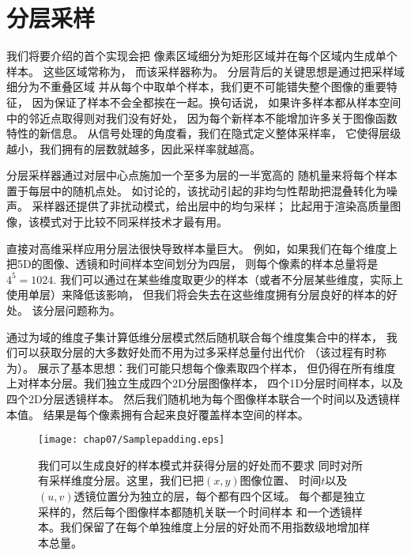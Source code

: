\section{分层采样}\label{sec:分层采样}
我们将要介绍的首个实现会把
像素区域细分为矩形区域并在每个区域内生成单个样本。
这些区域常称为，
而该采样器称为。
分层背后的关键思想是通过把采样域细分为不重叠区域
并从每个中取单个样本，我们更不可能错失整个图像的重要特征，
因为保证了样本不会全都挨在一起。换句话说，
如果许多样本都从样本空间中的邻近点取得则对我们没有好处，
因为每个新样本不能增加许多关于图像函数特性的新信息。
从信号处理的角度看，我们在隐式定义整体采样率，
它使得层级越小，我们拥有的层数就越多，因此采样率就越高。

分层采样器通过对层中心点施加一个至多为层的一半宽高的
随机量来将每个样本置于每层中的随机点处。
如讨论的，该扰动引起的非均匀性帮助把混叠转化为噪声。
采样器还提供了非扰动模式，给出层中的均匀采样；
比起用于渲染高质量图像，该模式对于比较不同采样技术才最有用。

直接对高维采样应用分层法很快导致样本量巨大。
例如，如果我们在每个维度上把5D的图像、透镜和时间样本空间划分为四层，
则每个像素的样本总量将是$4^5=1024$.
我们可以通过在某些维度取更少的样本（或者不分层某些维度，实际上使用单层）来降低该影响，
但我们将会失去在这些维度拥有分层良好的样本的好处。
该分层问题称为。

通过为域的维度子集计算低维分层模式然后随机联合每个维度集合中的样本，
我们可以获取分层的大多数好处而不用为过多采样总量付出代价
（该过程有时称为）。
展示了基本思想：我们可能只想每个像素取四个样本，
但仍得在所有维度上对样本分层。我们独立生成四个2D分层图像样本，
四个1D分层时间样本，以及四个2D分层透镜样本。
然后我们随机地为每个图像样本联合一个时间以及透镜样本值。
结果是每个像素拥有合起来良好覆盖样本空间的样本。
\begin{figure}[htbp]
    \centering\texttt{[image: chap07/Samplepadding.eps]}
    \caption{我们可以生成良好的样本模式并获得分层的好处而不要求
        同时对所有采样维度分层。这里，我们已把$(x,y)$图像位置、
        时间$t$以及$(u,v)$透镜位置分为独立的层，每个都有四个区域。
        每个都是独立采样的，然后每个图像样本都随机关联一个时间样本
        和一个透镜样本。我们保留了在每个单独维度上分层的好处而不用指数级地增加样本总量。}
    \label{fig:7.16}
\end{figure}

